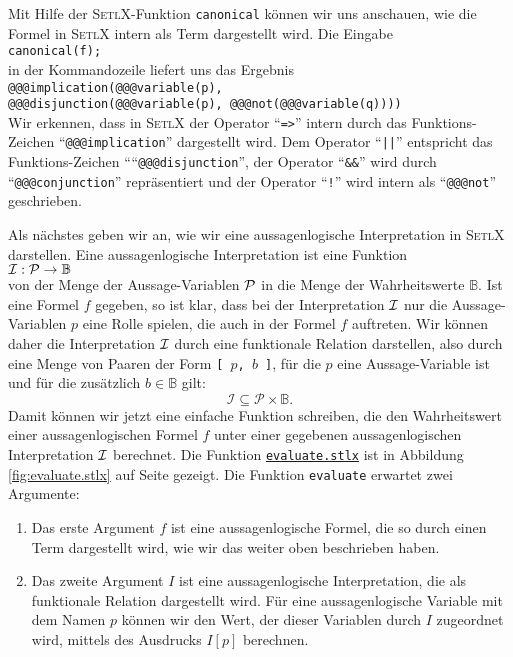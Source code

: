 Mit Hilfe der \textsc{SetlX}-Funktion \texttt{canonical} k\"{o}nnen wir uns anschauen, wie die
Formel in \textsc{SetlX} intern als Term dargestellt wird.  Die Eingabe
\\[0.2cm]
\hspace*{1.3cm}
\texttt{canonical(f);}
\\[0.2cm]
in der Kommandozeile liefert uns das Ergebnis
\\[0.2cm]
\hspace*{1.3cm}
\texttt{@@@implication(@@@variable(p), \\
\hspace*{4.4cm}
        @@@disjunction(@@@variable(p), @@@not(@@@variable(q))))}
\\[0.2cm]
Wir erkennen, dass in \textsc{SetlX} der Operator ``\texttt{=>}'' intern
durch das Funktions-Zeichen ``\texttt{@@@implication}'' dargestellt wird.
Dem Operator ``\texttt{||}'' entspricht das Funktions-Zeichen ````\texttt{@@@disjunction}'',
der Operator ``\texttt{\&\&}'' wird durch ``\texttt{@@@conjunction}'' repr\"{a}sentiert und
der Operator ``\texttt{!}'' wird intern als  ``\texttt{@@@not}'' geschrieben.

Als n\"{a}chstes geben wir an, wie wir eine aussagenlogische Interpretation in \textsc{SetlX}
darstellen.  Eine aussagenlogische Interpretation ist eine Funktion \\[0.2cm]
\hspace*{1.3cm} ${\cal I}: {\cal P} \rightarrow \mathbb{B}$ \\[0.2cm]
von der Menge der Aussage-Variablen ${\cal P}$ in die Menge der Wahrheitswerte 
$\mathbb{B}$.  Ist eine Formel $f$ gegeben, so ist klar, dass bei der
Interpretation ${\cal I}$ nur die Aussage-Variablen $p$ eine Rolle spielen,
die auch in der Formel $f$ auftreten.  Wir k\"{o}nnen daher die Interpretation
${\cal I}$ durch eine funktionale Relation darstellen, also durch eine Menge von
Paaren der Form \texttt{[ $p$, $b$ ]}, f\"{u}r die $p$ eine Aussage-Variable ist und f\"{u}r die zus\"{a}tzlich
$b \in \mathbb{B}$ gilt:
\[ \mathcal{I} \subseteq \mathcal{P} \times \mathbb{B}. \]
Damit k\"{o}nnen wir jetzt eine einfache Funktion schreiben, die den Wahrheitswert
einer aussagenlogischen Formel $f$ unter einer gegebenen aussagenlogischen
Interpretation ${\cal I}$ berechnet. Die Funktion
\href{https://github.com/karlstroetmann/Logik/blob/master/SetlX/evaluate.stlx}{\texttt{evaluate.stlx}}
ist in Abbildung \ref{fig:evaluate.stlx} auf Seite \pageref{fig:evaluate.stlx} gezeigt.
Die Funktion \texttt{evaluate} erwartet zwei Argumente:
\begin{enumerate}
\item Das erste Argument $f$ ist eine aussagenlogische Formel, die so durch einen Term dargestellt
      wird, wie wir das weiter oben beschrieben haben.
\item Das zweite Argument $I$ ist eine aussagenlogische Interpretation, die als funktionale Relation
      dargestellt wird.  F\"{u}r eine aussagenlogische Variable mit dem Namen $p$ k\"{o}nnen wir den Wert,
      der dieser Variablen durch $I$ zugeordnet wird, mittels des Ausdrucks $I[p]$ berechnen.
\end{enumerate}

